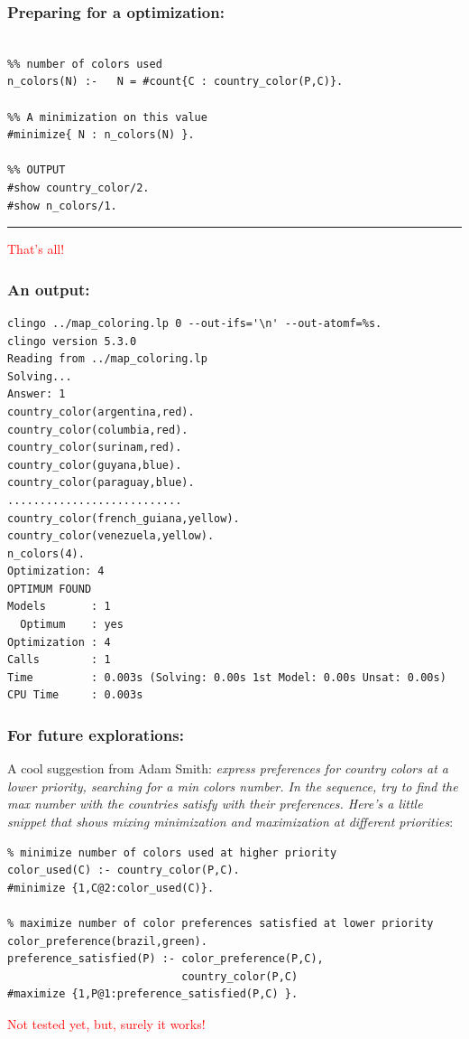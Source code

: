 \documentclass{beamer}
\begin{document}
\begin{frame}[fragile]
	\frametitle{Preparing for a optimization:}

{\small
\begin{verbatim}
	
%% number of colors used
n_colors(N) :-   N = #count{C : country_color(P,C)}.

%% A minimization on this value
#minimize{ N : n_colors(N) }.

%% OUTPUT
#show country_color/2.
#show n_colors/1.
\end{verbatim}
}	
\textcolor{red}{\hrule \vskip 0.2cm That's all!}
\end{frame}
\begin{frame} [fragile]
\frametitle{An output:}
	
{\small
\begin{verbatim}
clingo ../map_coloring.lp 0 --out-ifs='\n' --out-atomf=%s. 
clingo version 5.3.0
Reading from ../map_coloring.lp
Solving...
Answer: 1
country_color(argentina,red).
country_color(columbia,red).
country_color(surinam,red).
country_color(guyana,blue).
country_color(paraguay,blue).
...........................
country_color(french_guiana,yellow).
country_color(venezuela,yellow).
n_colors(4).
Optimization: 4
OPTIMUM FOUND
Models       : 1
  Optimum    : yes
Optimization : 4
Calls        : 1
Time         : 0.003s (Solving: 0.00s 1st Model: 0.00s Unsat: 0.00s)
CPU Time     : 0.003s
\end{verbatim}
}	
\end{frame}



\begin{frame}[fragile] 
 \frametitle{For future explorations:}

A cool suggestion from Adam Smith:  \emph{express preferences for country colors at a lower priority, searching for a min colors number. In the sequence, try to find the max number with the countries satisfy with their preferences. Here's a little snippet that shows mixing minimization and maximization at different priorities}:

{\small
\begin{verbatim}
% minimize number of colors used at higher priority
color_used(C) :- country_color(P,C).
#minimize {1,C@2:color_used(C)}. 

% maximize number of color preferences satisfied at lower priority
color_preference(brazil,green).
preference_satisfied(P) :- color_preference(P,C), 
                           country_color(P,C)
#maximize {1,P@1:preference_satisfied(P,C) }.	
\end{verbatim}
}	

\textcolor{red}{Not tested yet, but, surely it works!}

\end{frame}
\end{document}
